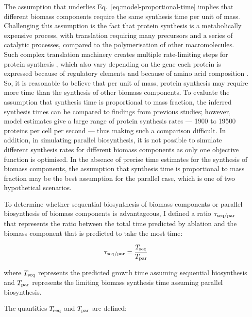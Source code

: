 The assumption that underlies Eq.\ \ref{eq:model-proportional-time} implies that different biomass components require the same synthesis time per unit of mass.
Challenging this assumption is the fact that protein synthesis is a metabolically expensive process, with translation requiring many precursors and a series of catalytic processes, compared to the polymerisation of other macromolecules.
Such complex translation machinery creates multiple rate-limiting steps for protein synthesis \parencite{shahRateLimitingStepsYeast2013}, which also vary depending on the gene each protein is expressed because of regulatory elements \parencite{lahtveeAbsoluteQuantificationProtein2017} and because of amino acid composition \parencite{chenYeastHasEvolved2022}.
So, it is reasonable to believe that per unit of mass, protein synthesis may require more time than the synthesis of other biomass components.
To evaluate the assumption that synthesis time is proportional to mass fraction, the inferred synthesis times can be compared to findings from previous studies; however, model estimates give a large range of protein synthesis rates --- \num{1900} to \num{19500} proteins per cell per second \parencite{seegerDynamicalStochasticModel2023} --- thus making such a comparison difficult.
In addition, in simulating parallel biosynthesis, it is not possible to simulate different synthesis rates for different biomass components as only one objective function is optimised.
In the absence of precise time estimates for the synthesis of biomass components, the assumption that synthesis time is proportional to mass fraction may be the best assumption for the parallel case, which is one of two hypothetical scenarios.

To determine whether sequential biosynthesis of biomass components or parallel biosynthesis of biomass components is advantageous, I defined a ratio $\tau_{\mathrm{seq}/\mathrm{par}}$ that represents the ratio between the total time predicted by ablation and the biomass component that is predicted to take the most time:

\begin{equation}
  \tau_{\mathrm{seq}/\mathrm{par}} = \frac{T_{\mathrm{seq}}}{T_{\mathrm{par}}}
  \label{eq:model-ratio-simplified}
\end{equation}

where $T_{\mathrm{seq}}$ represents the predicted growth time assuming sequential biosynthesis and $T_{\mathrm{par}}$ represents the limiting biomass synthesis time assuming parallel biosynthesis.

\pagebreak

The quantities $T_{\mathrm{seq}}$ and $T_{\mathrm{par}}$ are defined:

